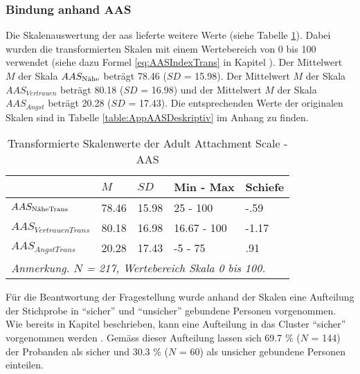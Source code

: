 \subsubsection{Bindung anhand AAS}
Die Skalenauswertung der \acrfull{aas} lieferte weitere Werte (siehe Tabelle \ref{table:AASDeskriptivTrans}). Dabei wurden die transformierten Skalen mit einem Wertebereich von 0 bis 100 verwendet (siehe dazu Formel \ref{eq:AASIndexTrans} in Kapitel \textit{}). Der Mittelwert $M$ der Skala $AAS_{\textnormal{Nähe}}$ beträgt 78.46 ($SD$ = 15.98). Der Mittelwert $M$ der Skala $AAS_{Vertrauen}$ beträgt 80.18 ($SD$ = 16.98) und der Mittelwert  $M$ der Skala $AAS_{Angst}$ beträgt 20.28 ($SD$ = 17.43). Die entsprechenden Werte der originalen Skalen sind in Tabelle \ref{table:AppAASDeskriptiv} im Anhang zu finden.

\begin{table}[ht]
\centering
\captionsetup{margin=70pt, skip=5pt}
\caption{Transformierte Skalenwerte der Adult Attachment Scale - AAS}
\label{table:AASDeskriptivTrans}
\begin{tabular}{m{7em} m{3em}  m{3em}  m{5em} m{3em}} 
  \hline
  & $M$ & $SD$ & Min - Max & Schiefe\\
  \hline
  $AAS_{\textit{\textnormal{NäheTrans}}}$ & 78.46 & 15.98 & 25 - 100 & -.59\\
  $AAS_{VertrauenTrans}$ & 80.18 & 16.98 & 16.67 - 100 & -1.17\\
  $AAS_{AngstTrans}$ & 20.28 & 17.43 & -5 - 75 & .91 \\
  \hline
  \multicolumn{5}{l}{\textit{Anmerkung. $N$ = 217, Wertebereich Skala 0 bis 100.}}\\
\end{tabular}
\end{table}

Für die Beantwortung der Fragestellung wurde anhand der Skalen eine Aufteilung der Stichprobe in \enquote{sicher} und \enquote{unsicher} gebundene Personen vorgenommen. Wie bereits in Kapitel \textit{} beschrieben, kann eine Aufteilung in das Cluster \enquote{sicher} vorgenommen werden \cite{Schuetzmann2004}. Gemäss dieser Aufteilung lassen sich 69.7 \% ($N$ = 144) der Probanden als sicher und 30.3 \% ($N$ = 60) als unsicher gebundene Personen einteilen. 


